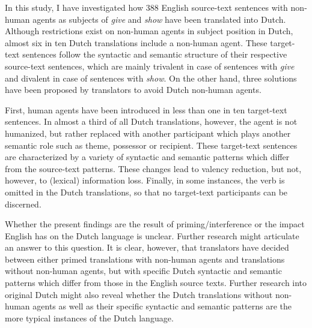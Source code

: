 \documentclass[output=paper]{LSP/langsci}
\begin{document}
In this study, I have investigated how 388 English source-text sentences with non-human agents as subjects of \textit{give} and \textit{show} have been translated into Dutch. Although restrictions exist on non-human agents in subject position in Dutch, almost six in ten Dutch translations include a non-human agent. These target-text sentences follow the syntactic and semantic structure of their respective source-text sentences, which are mainly trivalent in case of sentences with \textit{give} and divalent in case of sentences with \textit{show}. On the other hand, three solutions have been proposed by translators to avoid Dutch non-human agents.

First, human agents have been introduced in less than one in ten target-text sentences. In almost a third of all Dutch translations, however, the agent is not humanized, but rather replaced with another participant which plays another semantic role such as theme, possessor or recipient. These target-text sentences are characterized by a variety of syntactic and semantic patterns which differ from the source-text patterns. These changes lead to valency reduction, but not, however, to (lexical) information loss. Finally, in some instances, the verb is omitted in the Dutch translations, so that no target-text participants can be discerned. 

Whether the present findings are the result of priming/interference or the impact English has on the Dutch language \citep[see e.g.][]{House2008,Delsoir2011} is unclear. Further research might articulate an answer to this question. It is clear, however, that translators have decided between either primed translations with non-human agents and translations without non-human agents, but with specific Dutch syntactic and semantic patterns which differ from those in the English source texts. Further research into original Dutch might also reveal whether the Dutch translations without non-human agents as well as their specific syntactic and semantic patterns are the more typical instances of the Dutch language.            

\printbibliography[heading=subbibliography,notkeyword=this]
\end{document}

